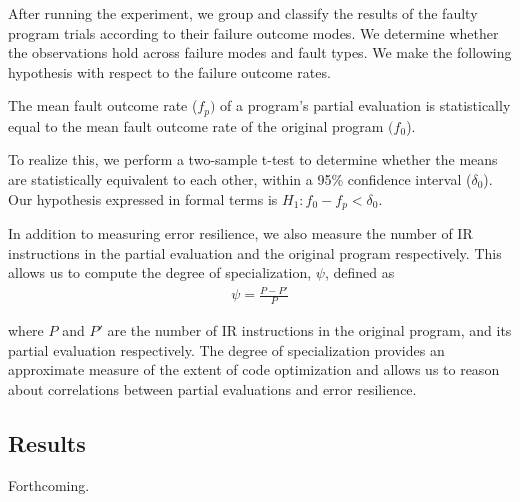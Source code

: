 After running the experiment, we group and classify the results of the faulty program trials according to their failure outcome modes.
We determine whether the observations hold across failure modes and fault types. 
We make the following hypothesis with respect to the failure outcome rates.

\begin{hyp}
  \label{hyp:hypothesis}
The mean fault outcome rate ($f_p)$ of a program's partial evaluation is statistically equal to the mean fault outcome rate of the original program $(f_0$).
\end{hyp}

To realize this, we perform a two-sample t-test to determine whether the means are statistically equivalent to each other, within a 95\% confidence interval ($\delta_0$).
Our hypothesis expressed in formal terms is $H_1: f_0 - f_p < \delta_0 $.

In addition to measuring error resilience, we also measure the number of IR instructions in the partial evaluation and the original program respectively.
This allows us to compute the degree of specialization, $\psi$, defined as
\begin{align*}
\psi = \frac{P - P'}{P}
\end{align*}

where $P$ and $P'$ are the number of IR instructions in the original program, and its partial evaluation respectively.
The degree of specialization provides an approximate measure of the extent of code optimization and allows us to reason about correlations between partial evaluations and error resilience.


\subsection{Results}
\label{sec:results}
Forthcoming.
